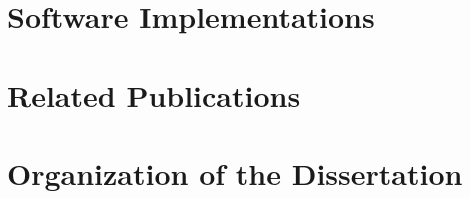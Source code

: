 \section{Software Implementations}
\section{Related Publications}
\section{Organization of the Dissertation}






